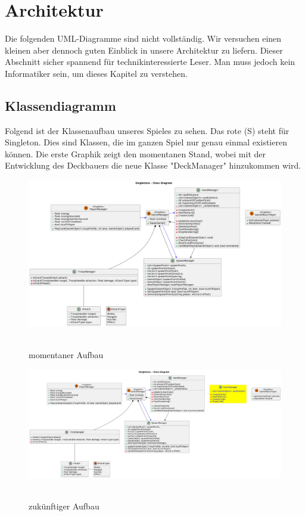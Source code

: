\chapter{Architektur}
Die folgenden UML-Diagramme sind nicht vollständig.
Wir versuchen einen kleinen aber dennoch guten Einblick in unsere Architektur zu liefern.
Dieser Abschnitt sicher spannend für technikinteressierte Leser. Man muss jedoch kein Informatiker sein, um dieses Kapitel zu verstehen.

\section{Klassendiagramm}
Folgend ist der Klassenaufbau unseres Spieles zu sehen.
Das rote (S) steht für Singleton.
Dies sind Klassen, die im ganzen Spiel nur genau einmal existieren können.
Die erste Graphik zeigt den momentanen Stand, wobei mit der Entwicklung des Deckbauers die neue Klasse "DeckManager" hinzukommen wird. 
\begin{figure}[H]
    \centering
    \includegraphics[width=13cm]{resources/Singletons.png} \\
    \caption{momentaner Aufbau}
\end{figure}

\begin{figure}[H]
    \centering
    \includegraphics[width=13cm]{resources/Singletons 2.png} \\
    \caption{zukünftiger Aufbau}
\end{figure}

